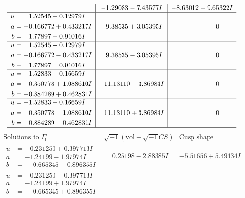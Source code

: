 \documentclass[1p]{elsarticle_modified}
\theoremstyle{definition}
\newcommand{\I}{\sqrt{-1}}
\begin{document}
$$\begin{array}{c|c|c}
 & -1.29083 - 7.43577 I & -8.63012 + 9.65322 I \\ \hline\begin{aligned}
u &= \phantom{-}1.52545 + 0.12979 I \\
a &= -0.166772 + 0.433217 I \\
b &= \phantom{-}1.77897 + 0.91016 I\end{aligned}
 & \phantom{-}9.38535 + 3.05395 I & \phantom{-0.000000 } 0 \\ \hline\begin{aligned}
u &= \phantom{-}1.52545 - 0.12979 I \\
a &= -0.166772 - 0.433217 I \\
b &= \phantom{-}1.77897 - 0.91016 I\end{aligned}
 & \phantom{-}9.38535 - 3.05395 I & \phantom{-0.000000 } 0 \\ \hline\begin{aligned}
u &= -1.52833 + 0.16659 I \\
a &= \phantom{-}0.350778 + 1.088610 I \\
b &= -0.884289 + 0.462831 I\end{aligned}
 & \phantom{-}11.13110 - 3.86984 I & \phantom{-0.000000 } 0 \\ \hline\begin{aligned}
u &= -1.52833 - 0.16659 I \\
a &= \phantom{-}0.350778 - 1.088610 I \\
b &= -0.884289 - 0.462831 I\end{aligned}
 & \phantom{-}11.13110 + 3.86984 I & \phantom{-0.000000 } 0\\
 \hline 
 \end{array}$$\newpage$$\begin{array}{c|c|c}  
\text{Solutions to }I^u_{1}& \I (\text{vol} + \sqrt{-1}CS) & \text{Cusp shape}\\
 \hline 
\begin{aligned}
u &= -0.231250 + 0.397713 I \\
a &= -1.24199 - 1.97974 I \\
b &= \phantom{-}0.665345 - 0.896355 I\end{aligned}
 & \phantom{-}0.25198 - 2.88385 I & -5.51656 + 5.49434 I \\ \hline\begin{aligned}
u &= -0.231250 - 0.397713 I \\
a &= -1.24199 + 1.97974 I \\
b &= \phantom{-}0.665345 + 0.896355 I\end{aligned}

\end{array}$$
\end{document}
